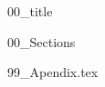 \documentclass{article}
\begin{document}
{00_title}

\frontmatter

\tableofcontents



\mainmatter


{00_Sections}


\newpage
\printbibliography[heading = bibintoc]    %

\newpage
\listoffigures
\listoftables

\newpage
{99_Apendix.tex}

\end{document}
